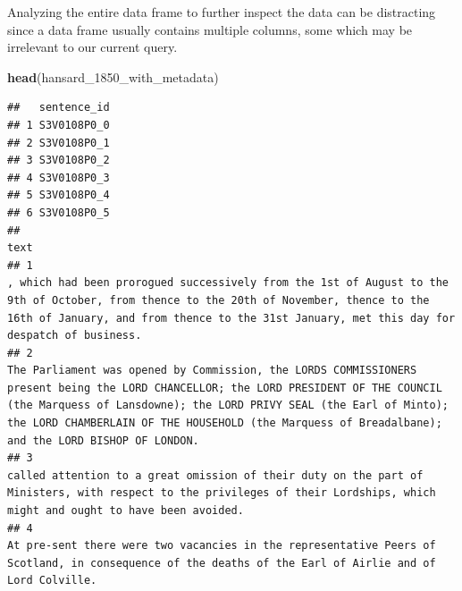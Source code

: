 \documentclass[
]{article}
\newenvironment{Shaded}{\begin{snugshade}}{\end{snugshade}}
\newcommand{\FunctionTok}[1]{\textcolor[rgb]{0.13,0.29,0.53}{\textbf{#1}}}
\newcommand{\NormalTok}[1]{#1}
\begin{document}
Analyzing the entire data frame to further inspect the data can be
distracting since a data frame usually contains multiple columns, some
which may be irrelevant to our current query.

\begin{Shaded}
\begin{Highlighting}[]
\FunctionTok{head}\NormalTok{(hansard\_1850\_with\_metadata)}
\end{Highlighting}
\end{Shaded}

\begin{verbatim}
##   sentence_id
## 1 S3V0108P0_0
## 2 S3V0108P0_1
## 3 S3V0108P0_2
## 4 S3V0108P0_3
## 5 S3V0108P0_4
## 6 S3V0108P0_5
##                                                                                                                                                                                                                                                                                                                                                                                                                                                          text
## 1                                                                                                                                                                                                                       , which had been prorogued successively from the 1st of August to the 9th of October, from thence to the 20th of November, thence to the 16th of January, and from thence to the 31st January, met this day for despatch of business.
## 2                                                                                                                                             The Parliament was opened by Commission, the LORDS COMMISSIONERS present being the LORD CHANCELLOR; the LORD PRESIDENT OF THE COUNCIL (the Marquess of Lansdowne); the LORD PRIVY SEAL (the Earl of Minto); the LORD CHAMBERLAIN OF THE HOUSEHOLD (the Marquess of Breadalbane); and the LORD BISHOP OF LONDON.
## 3                                                                                                                                                                                                                                                                                 called attention to a great omission of their duty on the part of Ministers, with respect to the privileges of their Lordships, which might and ought to have been avoided.
## 4                                                                                                                                                                                                                                                                                                      At pre-sent there were two vacancies in the representative Peers of Scotland, in consequence of the deaths of the Earl of Airlie and of Lord Colville.

\end{verbatim}
\end{document}
